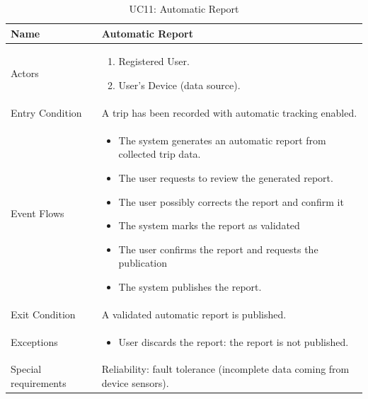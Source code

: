 \begin{table}[H]
    \centering
    \renewcommand{\arraystretch}{1.3}
    \begin{tabular}{|p{}|p{}|}
        \hline
        Name & \textbf{Automatic Report} \\
        \hline
        Actors & \begin{enumerate}[topsep=0pt, partopsep=0pt, leftmargin=*]
            \item Registered User. 
            \item User's Device (data source).
        \end{enumerate} \\
        \hline
        Entry Condition & A trip has been recorded with automatic tracking enabled. \\
        \hline
        Event Flows & \begin{itemize}[topsep=0pt, partopsep=0pt, leftmargin=*]
            \item The system generates an automatic report from collected trip data.
            \item The user requests to review the generated report.
            \item The user possibly corrects the report and confirm it
            \item The system marks the report as validated
            \item The user confirms the report and requests the publication
            \item The system publishes the report.
        \end{itemize} \\
        \hline
        Exit Condition & A validated automatic report is published. \\
        \hline
        Exceptions & \begin{itemize}[topsep=0pt, partopsep=0pt, leftmargin=*]
            \item User discards the report: the report is not published.
        \end{itemize} \\
        \hline
        Special requirements & Reliability: fault tolerance (incomplete data coming from device sensors).\\
        \hline
    \end{tabular}
    \caption{UC11: Automatic Report}
    \label{uc11}
\end{table}

